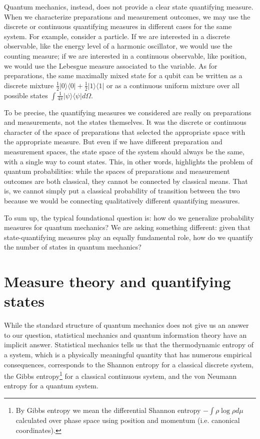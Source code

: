 \documentclass[10pt,twocolumn, nofootinbib]{revtex4-2}
\def\>{\rangle}
\def\<{\langle}
\begin{document}

Quantum mechanics, instead, does not provide a clear state quantifying measure. When we characterize preparations and measurement outcomes, we may use the discrete or continuous quantifying measures in different cases for the same system. For example, consider a particle. If we are interested in a discrete observable, like the energy level of a harmonic oscillator, we would use the counting measure; if we are interested in a continuous observable, like position, we would use the Lebesgue measure associated to the variable. As for preparations, the same maximally mixed state for a qubit can be written as a discrete mixture $\frac{1}{2} | 0 \> \< 0 | + \frac{1}{2} | 1 \> \< 1 | $ or as a continuous uniform mixture over all possible states $\int \frac{1}{4\pi} | \psi \> \< \psi | d\Omega$.

To be precise, the quantifying measures we considered are really on preparations and measurements, not the states themselves. It was the discrete or continuous character of the space of preparations that selected the appropriate space with the appropriate measure. But even if we have different preparation and measurement spaces, the state space of the system should always be the same, with a single way to count states. This, in other words, highlights the problem of quantum probabilities: while the spaces of preparations and measurement outcomes are both classical, they cannot be connected by classical means. That is, we cannot simply put a classical probability of transition between the two because we would be connecting qualitatively different quantifying measures.

To sum up, the typical foundational question is: how do we generalize probability measures for quantum mechanics? We are asking something different: given that state-quantifying measures play an equally fundamental role, how do we quantify the number of states in quantum mechanics?

\section{Measure theory and quantifying states}

While the standard structure of quantum mechanics does not give us an answer to our question, statistical mechanics and quantum information theory have an implicit answer. Statistical mechanics tells us that the thermodynamic entropy of a system, which is a physically meaningful quantity that has numerous empirical consequences, corresponds to the Shannon entropy for a classical discrete system, the Gibbs entropy\footnote{By Gibbs entropy we mean the differential Shannon entropy $-\int \rho \log \rho d\mu$ calculated over phase space using position and momentum (i.e. canonical coordinates).} for a classical continuous system, and the von Neumann entropy for a quantum system.
\end{document}

